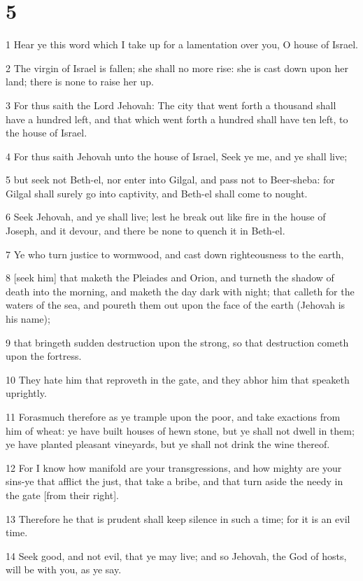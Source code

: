 \chapter{5}

\par 1 Hear ye this word which I take up for a lamentation over you, O house of Israel.
\par 2 The virgin of Israel is fallen; she shall no more rise: she is cast down upon her land; there is none to raise her up.
\par 3 For thus saith the Lord Jehovah: The city that went forth a thousand shall have a hundred left, and that which went forth a hundred shall have ten left, to the house of Israel.
\par 4 For thus saith Jehovah unto the house of Israel, Seek ye me, and ye shall live;
\par 5 but seek not Beth-el, nor enter into Gilgal, and pass not to Beer-sheba: for Gilgal shall surely go into captivity, and Beth-el shall come to nought.
\par 6 Seek Jehovah, and ye shall live; lest he break out like fire in the house of Joseph, and it devour, and there be none to quench it in Beth-el.
\par 7 Ye who turn justice to wormwood, and cast down righteousness to the earth,
\par 8 [seek him] that maketh the Pleiades and Orion, and turneth the shadow of death into the morning, and maketh the day dark with night; that calleth for the waters of the sea, and poureth them out upon the face of the earth (Jehovah is his name);
\par 9 that bringeth sudden destruction upon the strong, so that destruction cometh upon the fortress.
\par 10 They hate him that reproveth in the gate, and they abhor him that speaketh uprightly.
\par 11 Forasmuch therefore as ye trample upon the poor, and take exactions from him of wheat: ye have built houses of hewn stone, but ye shall not dwell in them; ye have planted pleasant vineyards, but ye shall not drink the wine thereof.
\par 12 For I know how manifold are your transgressions, and how mighty are your sins-ye that afflict the just, that take a bribe, and that turn aside the needy in the gate [from their right].
\par 13 Therefore he that is prudent shall keep silence in such a time; for it is an evil time.
\par 14 Seek good, and not evil, that ye may live; and so Jehovah, the God of hosts, will be with you, as ye say.
